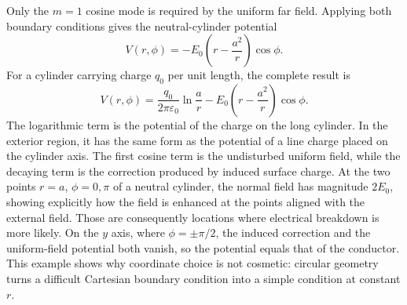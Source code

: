 Only the $m=1$ cosine mode is required by the uniform far field. Applying both boundary conditions gives the neutral-cylinder potential
\begin{equation}
\boxed{V(r,\phi)=-E_0\left(r-\frac{a^2}{r}\right)\cos\phi.}
\end{equation}
For a cylinder carrying charge $q_0$ per unit length, the complete result is
\begin{equation}
V(r,\phi)=\frac{q_0}{2\pi\varepsilon_0}\ln\frac{a}{r}
-E_0\left(r-\frac{a^2}{r}\right)\cos\phi.
\end{equation}
The logarithmic term is the potential of the charge on the long cylinder. In the exterior region, it has the same form as the potential of a line charge placed on the cylinder axis. The first cosine term is the undisturbed uniform field, while the decaying term is the correction produced by induced surface charge. At the two points $r=a$, $\phi=0,\pi$ of a neutral cylinder, the normal field has magnitude $2E_0$, showing explicitly how the field is enhanced at the points aligned with the external field. Those are consequently locations where electrical breakdown is more likely. On the $y$ axis, where $\phi=\pm\pi/2$, the induced correction and the uniform-field potential both vanish, so the potential equals that of the conductor. This example shows why coordinate choice is not cosmetic: circular geometry turns a difficult Cartesian boundary condition into a simple condition at constant $r$.